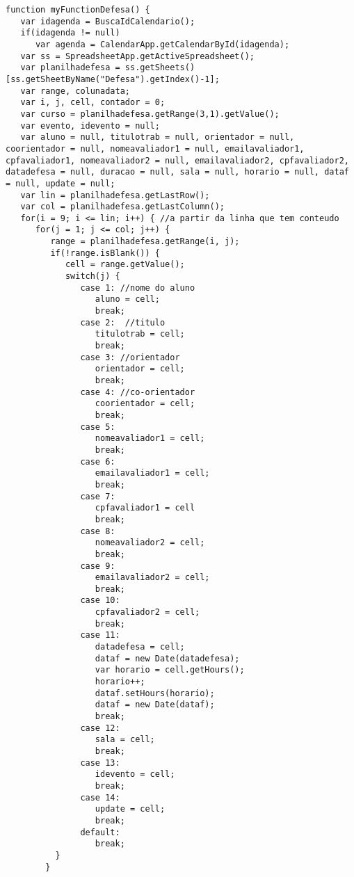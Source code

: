 \begin{lstlisting}
function myFunctionDefesa() {
   var idagenda = BuscaIdCalendario();
   if(idagenda != null)
      var agenda = CalendarApp.getCalendarById(idagenda);
   var ss = SpreadsheetApp.getActiveSpreadsheet();
   var planilhadefesa = ss.getSheets()[ss.getSheetByName("Defesa").getIndex()-1];
   var range, colunadata; 
   var i, j, cell, contador = 0;
   var curso = planilhadefesa.getRange(3,1).getValue();
   var evento, idevento = null;
   var aluno = null, titulotrab = null, orientador = null, coorientador = null, nomeavaliador1 = null, emailavaliador1, cpfavaliador1, nomeavaliador2 = null, emailavaliador2, cpfavaliador2, datadefesa = null, duracao = null, sala = null, horario = null, dataf = null, update = null;
   var lin = planilhadefesa.getLastRow();
   var col = planilhadefesa.getLastColumn();
   for(i = 9; i <= lin; i++) { //a partir da linha que tem conteudo
      for(j = 1; j <= col; j++) {
         range = planilhadefesa.getRange(i, j);
         if(!range.isBlank()) {
            cell = range.getValue();
            switch(j) {
               case 1: //nome do aluno
                  aluno = cell;
                  break;
               case 2:  //titulo
                  titulotrab = cell;
                  break;
               case 3: //orientador
                  orientador = cell;
                  break;
               case 4: //co-orientador
                  coorientador = cell; 
                  break;
               case 5: 
                  nomeavaliador1 = cell;
                  break;
               case 6:
                  emailavaliador1 = cell;
                  break;
               case 7: 
                  cpfavaliador1 = cell
                  break;
               case 8:
                  nomeavaliador2 = cell;
                  break;
               case 9:
                  emailavaliador2 = cell;
                  break;     
               case 10:
                  cpfavaliador2 = cell;
                  break;  
               case 11:
                  datadefesa = cell;
                  dataf = new Date(datadefesa);
                  var horario = cell.getHours();
                  horario++;
                  dataf.setHours(horario);
                  dataf = new Date(dataf);
                  break;
               case 12:
                  sala = cell;
                  break;  
               case 13:
                  idevento = cell;
                  break;  
               case 14:
                  update = cell;
                  break;
               default:
                  break;
          } 
        } 

\end{lstlisting}
